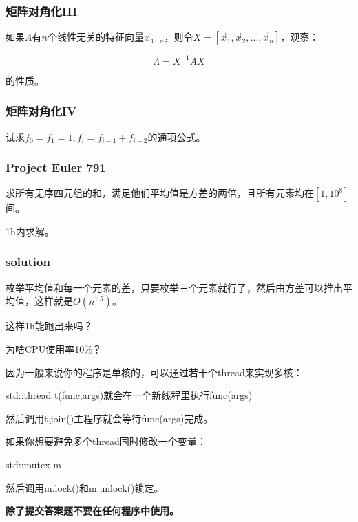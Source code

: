 \documentclass[10pt]{beamer}
\begin{document}
	\begin{frame}
		\frametitle{矩阵对角化III}
	
		如果$A$有$n$个线性无关的特征向量$\vec x_{1\dots n}$，则令$X=[\vec x_1,\vec x_2,\dots,\vec x_n]$，观察：

		$$
		\Lambda=X^{-1}AX
		$$

		的性质。
	
	\end{frame}
	\begin{frame}
		\frametitle{矩阵对角化IV}
	
		试求$f_0=f_1=1,f_i=f_{i-1}+f_{i-2}$的通项公式。
	
	\end{frame}
	\begin{frame}
		\frametitle{Project Euler 791}
	
		求所有无序四元组的和，满足他们平均值是方差的两倍，且所有元素均在$[1,10^8]$间。

		1h内求解。
	\end{frame}
	\begin{frame}
		\frametitle{solution}
	
		枚举平均值和每一个元素的差，只要枚举三个元素就行了，然后由方差可以推出平均值，这样就是$O(n^{1.5})$。

		这样1h能跑出来吗？


		为啥CPU使用率10\%？

		因为一般来说你的程序是单核的，可以通过若干个thread来实现多核：

		std::thread t(func,args)就会在一个新线程里执行func(args)

		然后调用t.join()主程序就会等待func(args)完成。

		如果你想要避免多个thread同时修改一个变量：
		
		std::mutex m

		然后调用m.lock()和m.unlock()锁定。

		\textbf{\color{red}除了提交答案题不要在任何程序中使用。}
	
	\end{frame}
\end{document}
